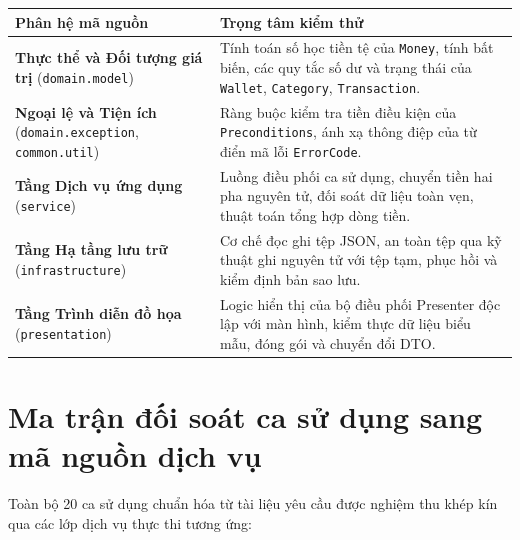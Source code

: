 \documentclass[a4paper,12pt]{report}
\newcommand{\passthrough}[1]{#1}
\newcounter{none}
\begin{document}
{\def\LTcaptype{none} %
\begin{longtable}[]{@{}
  >{\raggedright\arraybackslash}p{}
  >{\raggedright\arraybackslash}p{}@{}}
\toprule\noalign{}
\begin{minipage}[b]{\linewidth}\raggedright
Phân hệ mã nguồn
\end{minipage} & \begin{minipage}[b]{\linewidth}\raggedright
Trọng tâm kiểm thử
\end{minipage} \\
\midrule\noalign{}
\endhead
\bottomrule\noalign{}
\endlastfoot
\textbf{Thực thể và Đối tượng giá trị}
(\passthrough{\lstinline!domain.model!}) & Tính toán số học tiền tệ của
\passthrough{\lstinline!Money!}, tính bất biến, các quy tắc số dư và
trạng thái của \passthrough{\lstinline!Wallet!},
\passthrough{\lstinline!Category!},
\passthrough{\lstinline!Transaction!}. \\
\textbf{Ngoại lệ và Tiện ích}
(\passthrough{\lstinline!domain.exception!},
\passthrough{\lstinline!common.util!}) & Ràng buộc kiểm tra tiền điều
kiện của \passthrough{\lstinline!Preconditions!}, ánh xạ thông điệp của
từ điển mã lỗi \passthrough{\lstinline!ErrorCode!}. \\
\textbf{Tầng Dịch vụ ứng dụng} (\passthrough{\lstinline!service!}) &
Luồng điều phối ca sử dụng, chuyển tiền hai pha nguyên tử, đối soát dữ
liệu toàn vẹn, thuật toán tổng hợp dòng tiền. \\
\textbf{Tầng Hạ tầng lưu trữ} (\passthrough{\lstinline!infrastructure!})
& Cơ chế đọc ghi tệp JSON, an toàn tệp qua kỹ thuật ghi nguyên tử với
tệp tạm, phục hồi và kiểm định bản sao lưu. \\
\textbf{Tầng Trình diễn đồ họa} (\passthrough{\lstinline!presentation!})
& Logic hiển thị của bộ điều phối Presenter độc lập với màn hình, kiểm
thực dữ liệu biểu mẫu, đóng gói và chuyển đổi DTO. \\
\end{longtable}
}

\section{Ma trận đối soát ca sử dụng sang mã nguồn dịch
vụ}\label{ma-trux1eadn-ux111ux1ed1i-souxe1t-ca-sux1eed-dux1ee5ng-sang-muxe3-nguux1ed3n-dux1ecbch-vux1ee5}

Toàn bộ 20 ca sử dụng chuẩn hóa từ tài liệu yêu cầu được nghiệm thu khép
kín qua các lớp dịch vụ thực thi tương ứng:
\end{document}
